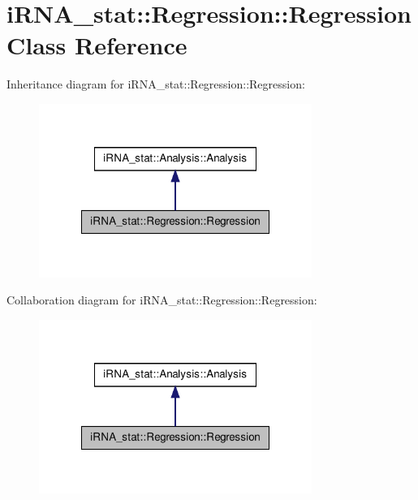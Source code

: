\hypertarget{classiRNA__stat_1_1Regression_1_1Regression}{
\section{i\-R\-N\-A\-\_\-stat\-:\-:\-Regression\-:\-:\-Regression \-Class \-Reference}
\label{classiRNA__stat_1_1Regression_1_1Regression}
}


\-Inheritance diagram for i\-R\-N\-A\-\_\-stat\-:\-:\-Regression\-:\-:\-Regression\-:
\nopagebreak
\begin{figure}[H]
\begin{center}
\leavevmode
\includegraphics[width=252pt]{classiRNA__stat_1_1Regression_1_1Regression__inherit__graph}
\end{center}
\end{figure}


\-Collaboration diagram for i\-R\-N\-A\-\_\-stat\-:\-:\-Regression\-:\-:\-Regression\-:
\nopagebreak
\begin{figure}[H]
\begin{center}
\leavevmode
\includegraphics[width=252pt]{classiRNA__stat_1_1Regression_1_1Regression__coll__graph}
\end{center}
\end{figure}
